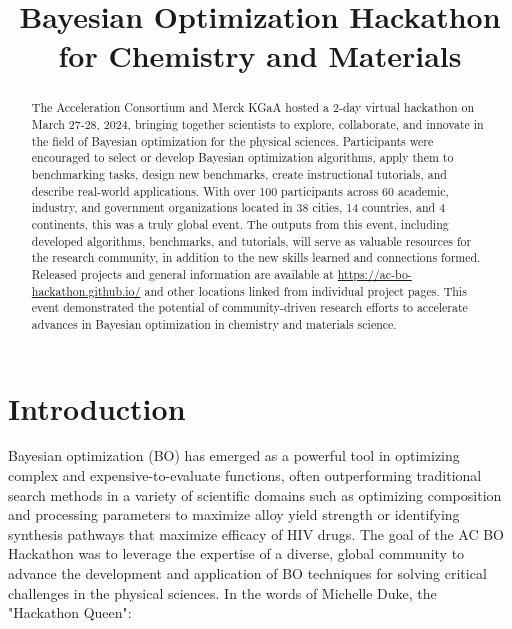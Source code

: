 \documentclass[superscriptaddress, nofootinbib,  amsmath, amssymb, preprint]{revtex4-2}
\begin{document}
\title{Bayesian Optimization Hackathon for Chemistry and Materials}

% 




\begin{abstract}
The Acceleration Consortium and Merck KGaA hosted a 2-day virtual hackathon on March 27-28, 2024, bringing together scientists to explore, collaborate, and innovate in the field of Bayesian optimization for the physical sciences. Participants were encouraged to select or develop Bayesian optimization algorithms, apply them to benchmarking tasks, design new benchmarks, create instructional tutorials, and describe real-world applications. With over 100 participants across 60 academic, industry, and government organizations located in 38 cities, 14 countries, and 4 continents, this was a truly global event. %
The outputs from this event, including developed algorithms, benchmarks, and tutorials, will serve as valuable resources for the research community, in addition to the new skills learned and connections formed. Released projects and general information are available at \url{https://ac-bo-hackathon.github.io/} and other locations linked from individual project pages. This event demonstrated the potential of community-driven research efforts to accelerate advances in Bayesian optimization in chemistry and materials science.
\end{abstract}

\maketitle



\section{Introduction}

Bayesian optimization (BO) has emerged as a powerful tool in optimizing complex and expensive-to-evaluate functions, often outperforming traditional search methods in a variety of scientific domains such as optimizing composition and processing parameters to maximize alloy yield strength or identifying synthesis pathways that maximize efficacy of HIV drugs. The goal of the AC BO Hackathon was to leverage the expertise of a diverse, global community to advance the development and application of BO techniques for solving critical challenges in the physical sciences. In the words of Michelle Duke, the "Hackathon Queen":
\end{document}
